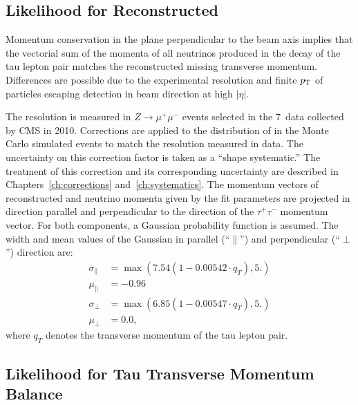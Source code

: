 \subsection{Likelihood for Reconstructed \MET}

Momentum conservation in the plane perpendicular to the beam axis implies that
the vectorial sum of the momenta of all neutrinos produced in the decay of the
tau lepton pair matches the reconstructed missing transverse momentum.
Differences are possible due to the experimental resolution and finite $p_{\mathrm{T}}$
of particles escaping detection in beam direction at high $\left| \eta \right|$.

The \MET resolution is measured in $Z \to \mu^{+} \mu^{-}$ events selected in
the $7$~\TeV data collected by CMS in 2010.  Corrections are applied to the
distribution of \MET in the Monte Carlo simulated events to match the resolution
measured in data.  The uncertainty on this correction factor is taken as a
``shape systematic.''  The treatment of this correction and its corresponding
uncertainty are described in Chapters~\ref{ch:corrections}
and~\ref{ch:systematics}.  The momentum vectors of reconstructed \MET and
neutrino momenta given by the fit parameters are projected in direction parallel
and perpendicular to the direction of the $\tau^{+} \tau^{-}$ momentum vector.
For both components, a Gaussian probability function is assumed.  The width and
mean values of the Gaussian in parallel (``$\parallel$'') and perpendicular
(``$\perp$'') direction are:
\begin{align}
\sigma_\parallel &= \max \left( 7.54 \left( 1 - 0.00542 \cdot q_{T} \right), 5. \right) \nonumber\\
\mu_\parallel &= -0.96 \nonumber \\
\sigma_\perp &= \max \left( 6.85 \left( 1 - 0.00547 \cdot q_{T} \right), 5. \right) \nonumber \\
\mu_\perp &= 0.0, \nonumber
\end{align}
where $q_{T}$ denotes the transverse momentum of the tau lepton pair.


\subsection{Likelihood for Tau Transverse Momentum Balance}
\label{sec:ptBalance}

